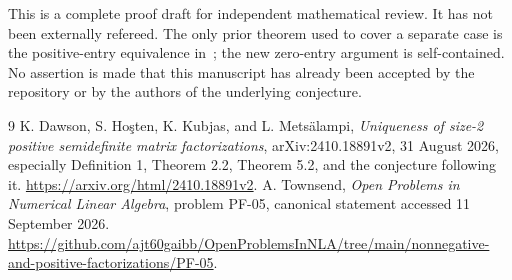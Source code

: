 \documentclass[11pt]{article}
\begin{document}
This is a complete proof draft for independent mathematical review. It has not been externally refereed. The only prior theorem used to cover a separate case is the positive-entry equivalence in~\cite{dhkm}; the new zero-entry argument is self-contained. No assertion is made that this manuscript has already been accepted by the repository or by the authors of the underlying conjecture.

\begin{thebibliography}{9}
K. Dawson, S. Ho\c{s}ten, K. Kubjas, and L. Mets\"alampi,
\emph{Uniqueness of size-2 positive semidefinite matrix factorizations},
arXiv:2410.18891v2, 31 August 2026, especially Definition 1, Theorem 2.2, Theorem 5.2, and the conjecture following it.
\url{https://arxiv.org/html/2410.18891v2}.
A. Townsend, \emph{Open Problems in Numerical Linear Algebra}, problem PF-05,
canonical statement accessed 11 September 2026.
\url{https://github.com/ajt60gaibb/OpenProblemsInNLA/tree/main/nonnegative-and-positive-factorizations/PF-05}.
\end{thebibliography}
\end{document}
